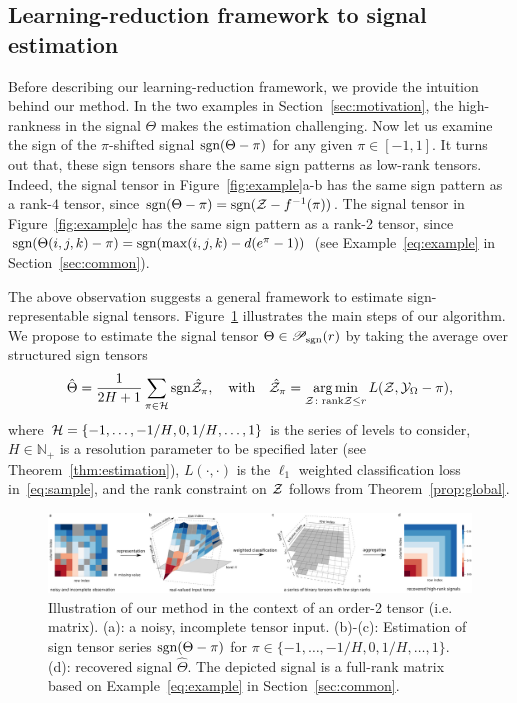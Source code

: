 \documentclass[twoside,11pt]{article}
\theoremstyle{definition}
\def\sign{\textup{sgn}}
\def\caliP{\mathscr{P}_{\textup{sgn}}}
\begin{document}
\subsection{Learning-reduction framework to signal estimation} 

Before describing our learning-reduction framework, we provide the intuition behind our method. In the two examples in Section~\ref{sec:motivation}, the high-rankness in the signal $\Theta$ makes the estimation challenging. Now let us examine the sign of the $\pi$-shifted signal $\sign(\Theta-\pi)$ for any given $\pi\in[-1,1]$. It turns out that, these sign tensors share the same sign patterns as low-rank tensors. Indeed, the signal tensor in Figure~\ref{fig:example}a-b has the same sign pattern as a rank-$4$ tensor, since $\sign(\Theta-\pi)=\sign(\tZ-f^{-1}(\pi))$. The signal tensor in Figure~\ref{fig:example}c has the same sign pattern as a rank-2 tensor, since $\sign(\Theta(i,j,k)-\pi)=\sign(\max(i,j,k)-d(e^{\pi}-1))$ (see Example~\ref{eq:example} in Section~\ref{sec:common}).

The above observation suggests a general framework to estimate sign-representable signal tensors. Figure~\ref{fig:demo} illustrates the main steps of our algorithm. We propose to estimate the signal tensor $\Theta\in\caliP(r)$ by taking the average over structured sign tensors
\begin{equation}\label{eq:est}
\hat \Theta = {1\over 2H+1}\sum_{\pi \in \tH}\sign{\hat \tZ_\pi}, \quad \text{with}\quad \hat \tZ_\pi = \argmin_{\tZ\colon \text{rank}\tZ\leq r} L(\tZ, \tY_\Omega-\pi),
\end{equation}
where $\mathcal{H}=\{-1,\ldots,-{1/ H}, 0, {1/H},\ldots,1\}$ is the series of levels to consider, $H\in\mathbb{N}_{+}$ is a resolution parameter to be specified later (see Theorem~\ref{thm:estimation}), $L(\cdot,\cdot)$ is the $\ell_1$ weighted classification loss in~\eqref{eq:sample}, and the rank constraint on $\mathcal{Z}$ follows from Theorem~\ref{prop:global}. 



\begin{figure}[t]
\centerline{\includegraphics[width=\textwidth]{figure/demo.pdf}}
\caption{Illustration of our method in the context of an order-2 tensor (i.e. matrix). (a): a noisy, incomplete tensor input. (b)-(c): Estimation of sign tensor series $\sign(\Theta-\pi)$ for $\pi\in  \{-1,\ldots,-{1/ H},0,{1/H},\ldots,1\}$. (d): recovered signal $\hat \Theta$. The depicted signal is a full-rank matrix based on Example~\ref{eq:example} in Section~\ref{sec:common}.}\label{fig:demo}
\end{figure}
\end{document}
